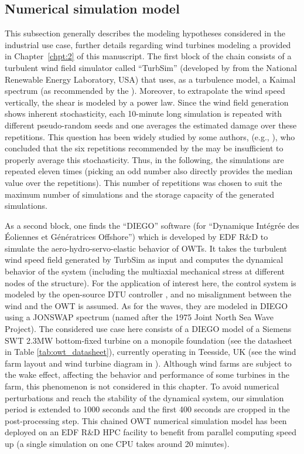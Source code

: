 \subsection{Numerical simulation model}
This subsection generally describes the modeling hypotheses considered in the industrial use case, further details regarding wind turbines modeling a provided in Chapter~\ref{chpt:2} of this manuscript. 
The first block of the chain consists of a turbulent wind field simulator called ``TurbSim'' (developed by \citealp{turbsim_2009} from the National Renewable Energy Laboratory, USA) that uses, as a turbulence model, a Kaimal spectrum \citep{kaimal_1972} (as recommended by the \citealp{iec_2019}). 
Moreover, to extrapolate the wind speed vertically, the shear is modeled by a power law. 
Since the wind field generation shows inherent stochasticity, each 10-minute long simulation is repeated with different pseudo-random seeds and one averages the estimated damage over these repetitions. 
This question has been widely studied by some authors, (e.g., \citealp{slot_sorensen_2020}), who concluded that the six repetitions recommended by the \citet{iec_2019} may be insufficient to properly average this stochasticity. 
Thus, in the following, the simulations are repeated eleven times (picking an odd number also directly provides the median value over the repetitions). 
This number of repetitions was chosen to suit the maximum number of simulations and the storage capacity of the generated simulations.

As a second block, one finds the ``DIEGO'' software (for ``Dynamique Intégrée des Éoliennes et Génératrices Offshore''\footnotemark) which is developed by EDF R\&D \citep{kim_natarajan_2022} to simulate the aero-hydro-servo-elastic behavior of OWTs. 
It takes the turbulent wind speed field generated by TurbSim as input and computes the dynamical behavior of the system (including the multiaxial mechanical stress at different nodes of the structure). 
For the application of interest here, the control system is modeled by the open-source DTU controller \citep{dtu_controler_2013}, and no misalignment between the wind and the OWT is assumed. 
As for the waves, they are modeled in DIEGO using a JONSWAP spectrum (named after the 1975 Joint North Sea Wave Project). 
The considered use case here consists of a DIEGO model of a Siemens SWT 2.3MW bottom-fixed turbine on a monopile foundation (see the datasheet in Table \ref{tab:owt_datasheet}), currently operating in Teesside, UK (see the wind farm layout and wind turbine diagram in ). 
Although wind farms are subject to the wake effect, affecting the behavior and performance of some turbines in the farm, this phenomenon is not considered in this chapter. 
To avoid numerical perturbations and reach the stability of the dynamical system, our simulation period is extended to 1000 seconds and the first 400 seconds are cropped in the post-processing step. 
This chained OWT numerical simulation model has been deployed on an EDF R\&D HPC facility to benefit from parallel computing speed up (a single simulation on one CPU takes around 20 minutes).

